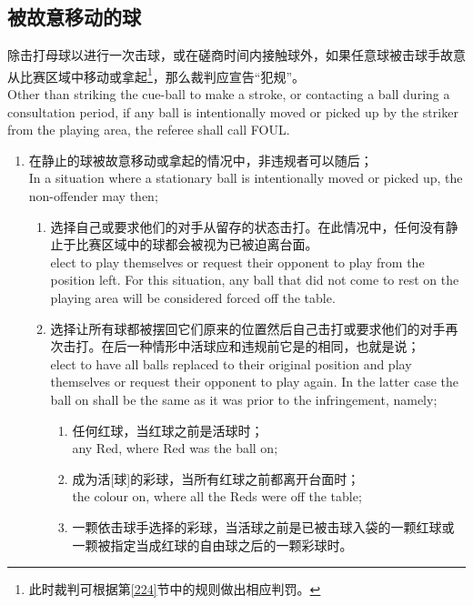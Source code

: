 \subsection{被故意移动的球}\label{22316}

\noindent 除击打母球以进行一次击球，或在磋商时间内接触球外，如果任意球被击球手故意从比赛区域中移动或拿起\footnote{此时裁判可根据第\ref{224}节中的规则做出相应判罚。}，那么裁判应宣告``犯规''。\\
Other than striking the cue-ball to make a stroke, or contacting a ball during a consultation period, if any ball is intentionally moved or picked up by the striker from the playing area, the referee shall call FOUL.
\begin{enumerate}[label=(\alph*)]
    \item \label{22316a}在静止的球被故意移动或拿起的情况中，非违规者可以随后；\\
    In a situation where a stationary ball is intentionally 
    moved or picked up, the non-offender may then;
    \begin{enumerate}[label=(\roman*)]
        \item 选择自己或要求他们的对手从留存的状态击打。在此情况中，任何没有静止于比赛区域中的球都会被视为已被迫离台面。\\
        elect to play themselves or request their opponent to play from the position left. For this situation, any ball that did not come to rest on the playing area will be considered forced off the table.
        \item 选择让所有球都被摆回它们原来的位置然后自己击打或要求他们的对手再次击打。在后一种情形中活球应和违规前它是的相同，也就是说；\\
        elect to have all balls replaced to their original position and play themselves or request their opponent to play again. In the latter case the ball on shall be the same as it was prior to the infringement, namely;
        \begin{enumerate}[label=(\roman*)]
            \item 任何红球，当红球之前是活球时；\\
            any Red, where Red was the ball on;
            \item 成为活[球]的彩球，当所有红球之前都离开台面时；\\
            the colour on, where all the Reds were off the table;
            \item 一颗依击球手选择的彩球，当活球之前是已被击球入袋的一颗红球或一颗被指定当成红球的自由球之后的一颗彩球时。\\

\end{enumerate}
\end{enumerate}
\end{enumerate}
